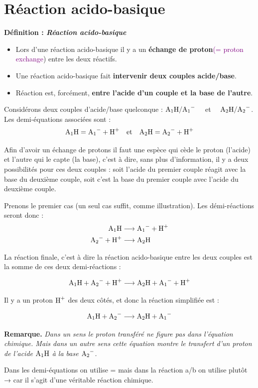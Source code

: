 \documentclass[11pt,a4paper]{article}
\newcommand{\To}{\longrightarrow}
\newcommand{\eng}[1]{\textcolor{purple}{(= #1})}
\newenvironment{defn}[1]
 {\begin{leftbar}\noindent \textbf{Définition :\textit{ \quad #1}} } { \end{leftbar}}
\newenvironment{rmrq}
 {\begin{shaded} \textbf{Remarque.\quad } \itshape } { \end{shaded}}
\begin{document}
\section*{Réaction acido-basique}%

\begin{defn}{Réaction acido-basique}
\begin{itemize}
    \item Lors d'une réaction acido-basique il y a un \textbf{échange de proton}\eng{proton exchange} entre les deux réactifs. 
    \item Une réaction acido-basique fait \textbf{intervenir deux couples acide/base}. 
    \item Réaction est, forcément, \textbf{entre l'acide d'un couple et la base de l'autre}. 
\end{itemize}
\end{defn}

Considérons deux couples d'acide/base quelconque : $\ce{A1H}/\ce{A1-} \quad $ et $\quad \ce{A2H}/\ce{A2-}$. Les demi-équations associées sont : 
$$ \ce{A1H} = \ce{A1-} + \ce{H+}\quad \text{et}\quad \ce{A2H} = \ce{A2-} + \ce{H+}$$

Afin d'avoir un échange de protons il faut une espèce qui cède le proton (l'acide) et l'autre qui le capte (la base), c'est à dire, sans plus d'information, il y a deux possibilités pour ces deux couples : soit l'acide du premier couple réagit avec la base du deuxième couple, soit c'est la base du premier couple avec l'acide du deuxième couple. 

Prenons le premier cas (un seul cas suffit, comme illustration). Les démi-réactions seront donc : 
\begin{align*}
    \ce{A1H} &\To \ce{A1-} + \ce{H+} \\
    \ce{A2-} + \ce{H+} &\To \ce{A2H}
\end{align*}

La réaction finale, c'est à dire la réaction acido-basique entre les deux couples est la somme de ces deux demi-réactions : 

$$\ce{A1H} + \ce{A2-} + \ce{H+} \To \ce{A2H} + \ce{A1-} + \ce{H+} $$

Il y a un proton $\ce{H+}$ des deux côtés, et donc la réaction simplifiée est  : 

$$\ce{A1H} + \ce{A2-} \To \ce{A2H} + \ce{A1-} $$

\begin{rmrq}
Dans un sens le proton transféré ne figure pas dans l’équation chimique. Mais dans un autre sens cette équation montre le transfert d’un proton de l’acide $\ce{A1H}$ à la base $\ce{A_2^-}$. 

Dans les demi-équations on utilise = mais dans la réaction a/b on utilise plutôt → car il s’agit d’une véritable réaction chimique. 

\end{rmrq}
\end{document}
